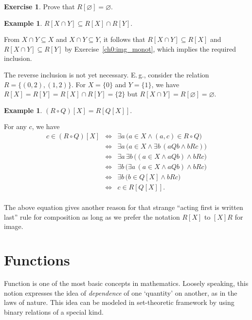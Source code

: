 \documentclass[12pt,notitlepage]{article}
\theoremstyle{plain}
\theoremstyle{definition}
\newtheorem{exc}[thm]{Exercise}
\newtheorem{exm}[thm]{Example}
\theoremstyle{plain}
\newcommand{\sbs}{\subseteq}
\newcommand{\void}{\varnothing}
\newcommand{\1}{\mathbf{1}}
\newcommand{\0}{\mathbf{0}}
\begin{document}
\begin{exc}
Prove that $R[\void] = \void$.
\end{exc}

\begin{exm}\label{ch0:exm25}
$R[X \cap Y] \sbs R[X] \cap R[Y]$.

From $X \cap Y \sbs X$ and $X \cap Y \sbs Y$, it follows that $R[X \cap Y] \sbs R[X]$ and $R[X \cap Y] \sbs R[Y]$ by Exercise~\ref{ch0:img_monot}, which implies the required inclusion.

The reverse inclusion is not yet necessary. E.\,g., consider the relation $R = \{(0,2), (1,2)\}$. For $X = \{0\}$ and $Y = \{1\}$, we have $R[X] = R[Y] = R[X] \cap R[Y]  = \{2\}$ but $R[X \cap Y] = R[\void] = \void$.
\end{exm}

\begin{exm}
$(R \circ Q)[X] = R[Q[X]]$.

For any $c$, we have
$$
\begin{array}{rcl}
c \in (R \circ Q)[X] &\iff& \exists a\, \bigl( a \in X \wedge (a,c) \in R \circ Q \bigr)\\
&\iff& \exists a\, \bigl( a \in X \wedge \exists b\, ( a Q b \wedge b R c) \bigr)\\
&\iff& \exists a\, \exists b\,\bigl( (a \in X \wedge a Q b) \wedge b R c \bigr)\\
&\iff& \exists b\, \bigl( \exists a\, (a \in X \wedge a Q b) \wedge b R c \bigr)\\
&\iff& \exists b\, \bigl( b \in Q[X] \wedge b R c \bigr)\\
&\iff& c \in R[Q[X]].\\
\end{array}
$$
\end{exm}
The above equation gives another reason for that strange ``acting first is written last'' rule for composition as long as we prefer the notation $R[X]$ to $[X]R$ for image. 

\newpage
\section{Functions}
Function is one of the most basic concepts in mathematics. Loosely speaking, this notion expresses the idea of \emph{dependence} of one `quantity' on another, as in the laws of nature. This idea can be modeled in set-theoretic framework by using binary relations of a special kind.
\end{document}
